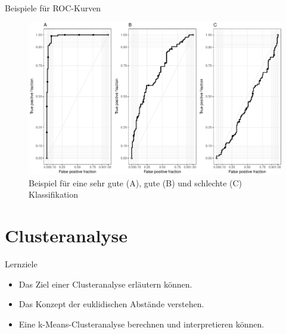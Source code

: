 \begin{frame}{Beispiele für ROC-Kurven}

\begin{figure}

{\centering \includegraphics[width=0.8\linewidth]{PraDa_Folien_nm_2_files/figure-beamer/example-rocs-1} 

}

\caption{Beispiel für eine sehr gute (A), gute (B) und schlechte (C) Klassifikation}\label{fig:example-rocs}
\end{figure}

\end{frame}

\section{Clusteranalyse}\label{clusteranalyse}

\begin{frame}{Lernziele}

\begin{itemize}
\tightlist
\item
  Das Ziel einer Clusteranalyse erläutern können.
\item
  Das Konzept der euklidischen Abstände verstehen.
\item
  Eine k-Means-Clusteranalyse berechnen und interpretieren können.
\end{itemize}

\end{frame}

